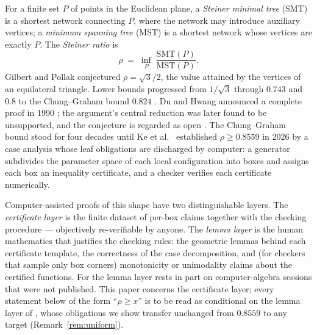 \documentclass[11pt]{article}
\newcommand{\rr}{\rho}
\begin{document}
For a finite set $P$ of points in the Euclidean plane, a \emph{Steiner
minimal tree} (SMT) is a shortest network connecting $P$, where the
network may introduce auxiliary vertices; a \emph{minimum spanning tree}
(MST) is a shortest network whose vertices are exactly $P$. The
\emph{Steiner ratio} is
\[
\rr \;=\; \inf_{P}\; \frac{\mathrm{SMT}(P)}{\mathrm{MST}(P)} .
\]
Gilbert and Pollak \cite{GP68} conjectured $\rr = \sqrt{3}/2$, the value
attained by the vertices of an equilateral triangle. Lower bounds
progressed from $1/\sqrt{3}$ \cite{GH76} through $0.743$ \cite{CH78} and
$0.8$ \cite{DH83} to the Chung--Graham bound $0.824$ \cite{CG85}. Du and
Hwang announced a complete proof in 1990 \cite{DH90,DH92}; the argument's
central reduction was later found to be unsupported, and the conjecture
is regarded as open \cite{IT12}. The Chung--Graham bound stood for four
decades until Ke et al.\ \cite{PKU26} established $\rr \ge 0.8559$ in
2026 by a case analysis whose leaf obligations are discharged by
computer: a generator subdivides the parameter space of each local
configuration into boxes and assigns each box an inequality certificate,
and a checker verifies each certificate numerically.

Computer-assisted proofs of this shape have two distinguishable layers.
The \emph{certificate layer} is the finite dataset of per-box claims
together with the checking procedure --- objectively re-verifiable by
anyone. The \emph{lemma layer} is the human mathematics that justifies
the checking rules: the geometric lemmas behind each certificate template,
the correctness of the case decomposition, and (for checkers that sample
only box corners) monotonicity or unimodality claims about the certified
functions. For \cite{PKU26} the lemma layer rests in part on
computer-algebra sessions that were not published. This paper concerns
the certificate layer; every statement below of the form ``$\rr \ge x$''
is to be read as conditional on the lemma layer of \cite{PKU26}, whose
obligations we show transfer unchanged from $0.8559$ to any target
(Remark~\ref{rem:uniform}).
\end{document}
